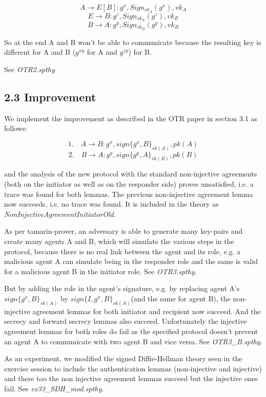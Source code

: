 \documentclass[
]{article}
\begin{document}
\[ A \rightarrow E[B] : g^x, Sign_{sk_A} (g^x), vk_A \]
\[ E \rightarrow B : g^z, Sign_{sk_E} (g^z), vk_E \]
\[ B \rightarrow A : g^y, Sign_{sk_B} (g^y), vk_B \]

So at the end A and B won't be able to communicate because the resulting key is different for A and B ($g^{xy}$ for A and $g^{zy }$) for B.

See \emph{OTR2.spthy}

\newpage
\hypertarget{improvement}{%
\subsection{2.3 Improvement}\label{improvement}}

We implement the improvement as described in the OTR paper in section 3.1 as follows:

\[ \text{1.} \quad A \rightarrow B: g^x, sign\{g^x, B\}_{sk(A)}, pk(A) \]
\[ \text{2.} \quad B \rightarrow A: g^y, sign\{g^y, A\}_{sk(B)}, pk(B) \]

and the analysis of the new protocol with the standard non-injective agreements (both on the initiator as well as on the responder side) proves unsatisfied, i.e. a trace was found for both lemmas. The previous non-injective agreement lemma now succeeds, i.e. no trace was found. It is included in the theory as \emph{NonInjectiveAgreementInitiatorOld}.

As per tamarin-prover, an adversary is able to generate many key-pairs and create many agents A and B, which will simulate the various steps in the protocol, because there is no real link between the agent and its role, e.g. a malicious agent A can simulate being in the responder role and the same is valid for a malicious agent B in the initiator role. See \emph{OTR3.spthy}.

But by adding the role in the agent's signature, e.g. by replacing agent A's  $sign\{g^x, B\}_{sk(A)}$  by  $sign\{I, g^x, B\}_{sk(A)}$(and the same for agent B), the non-injective agreement lemmas for both initiator and recipient now succeed. And the secrecy and forward secrecy lemmas also succeed. Unfortunately the injective agreement lemmas for both roles do fail as the specified protocol doesn't prevent an agent A to communicate with two agent B and vice versa. See \emph{OTR3\_B.spthy}.

As an experiment, we modified the signed Diffie-Hellman theory seen in the exercise session to include the authentication lemmas (non-injective and injective) and there too the non injective agreement lemmas succeed but the injective ones fail. See \emph{ex33\_SDH\_mod.spthy}.
\end{document}
